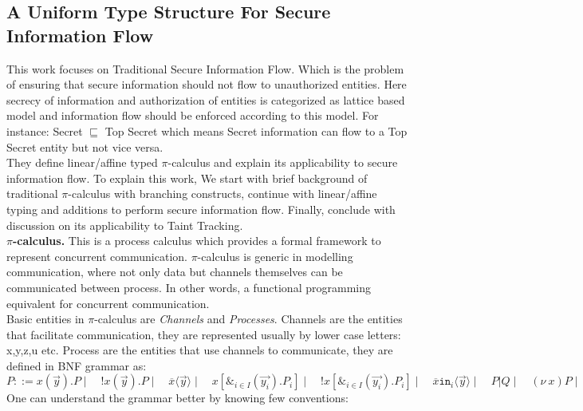 \documentclass[11pt, pdftex]{article}
\begin{document}
\subsection{A Uniform Type Structure For Secure Information Flow}
This work\cite{honda2002uniform} focuses on Traditional Secure Information Flow. Which is the problem of ensuring that secure information should not flow to unauthorized entities. Here secrecy of information and authorization of entities is categorized as lattice based model and information flow should be enforced according to this model. For instance: Secret $ \sqsubseteq $ Top Secret which means Secret information can flow to a Top Secret entity but not vice versa. \\
They define linear/affine typed $\pi$-calculus and explain its applicability to secure information flow. To explain this work, We start with brief background of traditional $\pi$-calculus with branching constructs, continue with linear/affine typing and additions to perform secure information flow. Finally, conclude with discussion on its applicability to Taint Tracking.\\
\textbf{$\pi$-calculus.} This is a process calculus\cite{kobayashi1999linearity} which provides a formal framework to represent concurrent communication.  $\pi$-calculus is generic in modelling communication, where not only data but channels themselves can be communicated between process. In other words, a functional programming equivalent for concurrent communication.\\
Basic entities in $\pi$-calculus are \textit{Channels} and \textit{Processes}. Channels are the entities that facilitate communication, they are represented usually by lower case letters: x,y,z,u etc. Process are the entities that use channels to communicate, they are defined in BNF grammar\cite{bnf} as: \\
$P ::= x(\overrightarrow{y}).P \mid \quad !x(\overrightarrow{y}).P \mid \quad \overline{x}\langle\overrightarrow{y}\rangle \mid \quad x[\&_{i \in I}(\overrightarrow{y_{i}}).P_{i}] \mid \quad !x[\&_{i \in I}(\overrightarrow{y_{i}}).P_{i}] \mid
 \quad \overline{x}\texttt{in}_{i}\langle\overrightarrow{y}\rangle \mid  \quad P|Q \mid  \quad (\nu\ x)P \mid \quad 0
$ \\
One can understand the grammar better by knowing few conventions:
\end{document}
